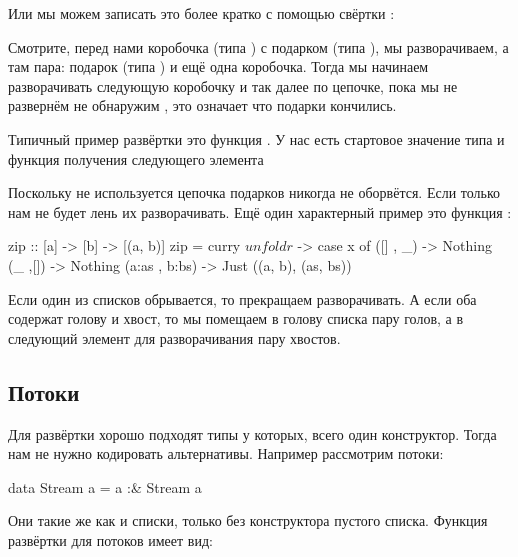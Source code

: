Или мы можем записать это более кратко с помощью свёртки :


Смотрите, перед нами коробочка (типа ) с подарком (типа ), 
мы разворачиваем, а там пара: подарок (типа ) и ещё одна коробочка. Тогда
мы начинаем разворачивать следующую коробочку и так далее по цепочке,
пока мы не развернём не обнаружим , это означает
что подарки кончились.


Типичный пример развёртки это функция . 
У нас есть стартовое значение типа  и функция
получения следующего элемента 


Поскольку  не используется цепочка подарков 
никогда не оборвётся. Если только нам не будет лень их
разворачивать. Ещё один характерный пример это 
функция :

\begin{code}
zip :: [a] -> [b] -> [(a, b)]
zip = curry $ unfoldr $ \x -> case x of
    ([]     , _)     -> Nothing
    (_      ,[])     -> Nothing
    (a:as   , b:bs)  -> Just ((a, b), (as, bs)) 
\end{code}

Если один из списков обрывается, то прекращаем разворачивать.
А если оба содержат голову и хвост, то мы помещаем в голову списка
пару голов, а в следующий элемент для разворачивания пару хвостов.

\subsection{Потоки}

Для развёртки хорошо подходят типы у которых, всего один
конструктор. Тогда нам не нужно кодировать альтернативы.
Например рассмотрим потоки:

\begin{code}
data Stream a = a :& Stream a
\end{code}

Они такие же как и списки, только без конструктора пустого списка.
Функция развёртки для потоков имеет вид:

